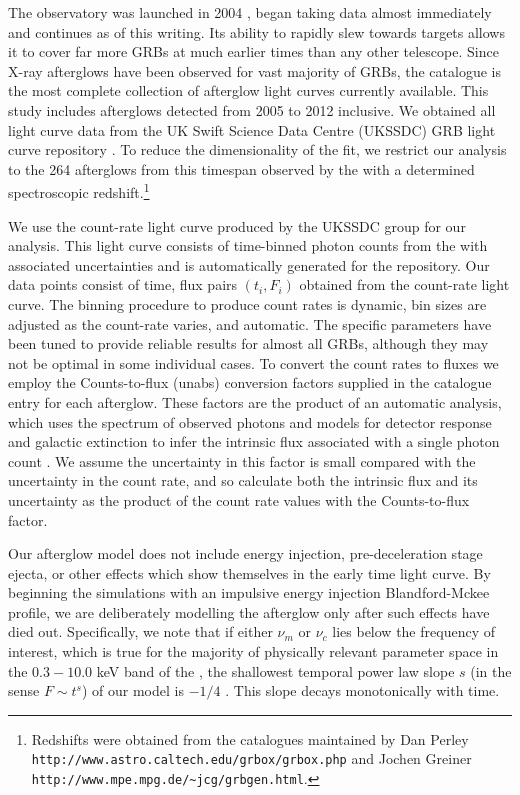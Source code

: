 The \swift{} observatory was launched in 2004 \citep{SWIFT}, began taking data almost immediately and continues as of this writing.  Its ability to rapidly slew towards targets allows it to cover far more GRBs at much earlier times than any other telescope.  Since X-ray afterglows have been observed for vast majority of GRBs, the \swiftXRT{} catalogue is the most complete collection of afterglow light curves currently available.  This study includes \swiftXRT{} afterglows detected from 2005 to 2012 inclusive.  We obtained all light curve data from the UK Swift Science Data Centre (UKSSDC) \swiftXRT{} GRB light curve repository \citep{SWIFTonline, SWIFTauto}.  To reduce the dimensionality of the fit, we restrict our analysis to the 264 afterglows from this timespan observed by the \swiftXRT{} with a determined spectroscopic redshift.\footnote{\label{ft:z} Redshifts were obtained from the catalogues maintained by Dan Perley \texttt{http://www.astro.caltech.edu/grbox/grbox.php} and Jochen Greiner \texttt{http://www.mpe.mpg.de/\textasciitilde jcg/grbgen.html}.}

We use the count-rate light curve produced by the UKSSDC group for our analysis.  This light curve consists of time-binned photon counts from the \swiftXRT{} with associated uncertainties and is automatically generated for the repository.    Our data points consist of time, flux pairs $(t_i, F_i)$ obtained from the count-rate light curve.  The binning procedure to produce count rates is dynamic, bin sizes are adjusted as the count-rate varies, and automatic.  The specific parameters have been tuned to provide reliable results for almost all GRBs, although they may not be optimal in some individual cases.  To convert the count rates to fluxes we employ the Counts-to-flux (unabs) conversion factors supplied in the catalogue entry for each afterglow.  These factors are the product of an automatic analysis, which uses the spectrum of observed photons and models for detector response and galactic extinction to infer the intrinsic flux associated with a single photon count \citep{SWIFTauto}.  We assume the uncertainty in this factor is small compared with the uncertainty in the count rate, and so calculate both the intrinsic flux and its uncertainty as the product of the count rate values with the Counts-to-flux factor.  

Our afterglow model does not include energy injection, pre-deceleration stage ejecta, or other effects which show themselves in the early time light curve.  By beginning the simulations with an impulsive energy injection Blandford-Mckee profile, we are deliberately modelling the afterglow only after such effects have died out.  Specifically, we note that if either $\nu_m$ or $\nu_c$ lies below the frequency of interest, which is true for the majority of physically relevant parameter space in the $0.3-10.0$ keV band of the \XRT{}, the shallowest temporal power law slope $s$ (in the sense $F \sim t^s$) of our model is $-1/4$ \citep{Sari98}. This slope decays monotonically with time.

